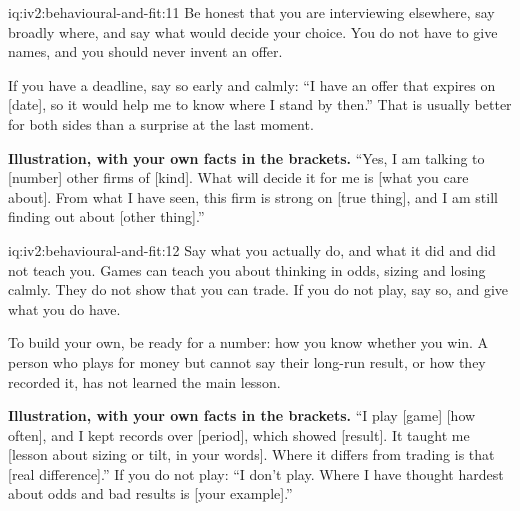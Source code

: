 \begin{solution}{iq:iv2:behavioural-and-fit:11}
Be honest that you are interviewing elsewhere, say broadly where, and say what would decide your choice. You do not have to give names, and you should never invent an offer.

If you have a deadline, say so early and calmly: ``I have an offer that expires on [date], so it would help me to know where I stand by then.'' That is usually better for both sides than a surprise at the last moment.

\textbf{Illustration, with your own facts in the brackets.} ``Yes, I am talking to [number] other firms of [kind]. What will decide it for me is [what you care about]. From what I have seen, this firm is strong on [true thing], and I am still finding out about [other thing].''

\end{solution}

\begin{solution}{iq:iv2:behavioural-and-fit:12}
Say what you actually do, and what it did and did not teach you. Games can teach you about thinking in odds, sizing and losing calmly. They do not show that you can trade. If you do not play, say so, and give what you do have.

To build your own, be ready for a number: how you know whether you win. A person who plays for money but cannot say their long-run result, or how they recorded it, has not learned the main lesson.

\textbf{Illustration, with your own facts in the brackets.} ``I play [game] [how often], and I kept records over [period], which showed [result]. It taught me [lesson about sizing or tilt, in your words]. Where it differs from trading is that [real difference].'' If you do not play: ``I don't play. Where I have thought hardest about odds and bad results is [your example].''

\end{solution}

